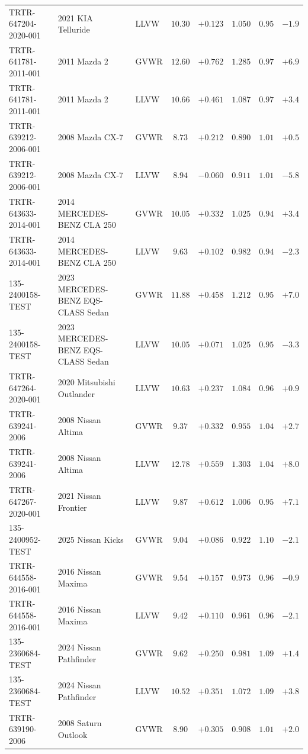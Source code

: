 \documentclass[12pt, twoside]{amsart}
\theoremstyle{definition}
\begin{document}
{\begin{longtable}{lp{2.9cm}lccccc}
TRTR-647204-2020-001 & 2021 KIA Telluride & LLVW & $10.30$ & $+0.123$ & $1.050$ & $0.95$ & $-1.9$\\
TRTR-641781-2011-001 & 2011 Mazda 2 & GVWR & $12.60$ & $+0.762$ & $1.285$ & $0.97$ & $+6.9$\\
TRTR-641781-2011-001 & 2011 Mazda 2 & LLVW & $10.66$ & $+0.461$ & $1.087$ & $0.97$ & $+3.4$\\
TRTR-639212-2006-001 & 2008 Mazda CX-7 & GVWR & $8.73$ & $+0.212$ & $0.890$ & $1.01$ & $+0.5$\\
TRTR-639212-2006-001 & 2008 Mazda CX-7 & LLVW & $8.94$ & $-0.060$ & $0.911$ & $1.01$ & $-5.8$\\
TRTR-643633-2014-001 & 2014 MERCEDES-BENZ CLA 250 & GVWR & $10.05$ & $+0.332$ & $1.025$ & $0.94$ & $+3.4$\\
TRTR-643633-2014-001 & 2014 MERCEDES-BENZ CLA 250 & LLVW & $9.63$ & $+0.102$ & $0.982$ & $0.94$ & $-2.3$\\
135-2400158-TEST & 2023 MERCEDES-BENZ EQS-CLASS Sedan & GVWR & $11.88$ & $+0.458$ & $1.212$ & $0.95$ & $+7.0$\\
135-2400158-TEST & 2023 MERCEDES-BENZ EQS-CLASS Sedan & LLVW & $10.05$ & $+0.071$ & $1.025$ & $0.95$ & $-3.3$\\
TRTR-647264-2020-001 & 2020 Mitsubishi Outlander & LLVW & $10.63$ & $+0.237$ & $1.084$ & $0.96$ & $+0.9$\\
TRTR-639241-2006 & 2008 Nissan Altima & GVWR & $9.37$ & $+0.332$ & $0.955$ & $1.04$ & $+2.7$\\
TRTR-639241-2006 & 2008 Nissan Altima & LLVW & $12.78$ & $+0.559$ & $1.303$ & $1.04$ & $+8.0$\\
TRTR-647267-2020-001 & 2021 Nissan Frontier & LLVW & $9.87$ & $+0.612$ & $1.006$ & $0.95$ & $+7.1$\\
135-2400952-TEST & 2025 Nissan Kicks & GVWR & $9.04$ & $+0.086$ & $0.922$ & $1.10$ & $-2.1$\\
TRTR-644558-2016-001 & 2016 Nissan Maxima & GVWR & $9.54$ & $+0.157$ & $0.973$ & $0.96$ & $-0.9$\\
TRTR-644558-2016-001 & 2016 Nissan Maxima & LLVW & $9.42$ & $+0.110$ & $0.961$ & $0.96$ & $-2.1$\\
135-2360684-TEST & 2024 Nissan Pathfinder & GVWR & $9.62$ & $+0.250$ & $0.981$ & $1.09$ & $+1.4$\\
135-2360684-TEST & 2024 Nissan Pathfinder & LLVW & $10.52$ & $+0.351$ & $1.072$ & $1.09$ & $+3.8$\\
TRTR-639190-2006 & 2008 Saturn Outlook & GVWR & $8.90$ & $+0.305$ & $0.908$ & $1.01$ & $+2.0$\\

\end{longtable}}
\end{document}
